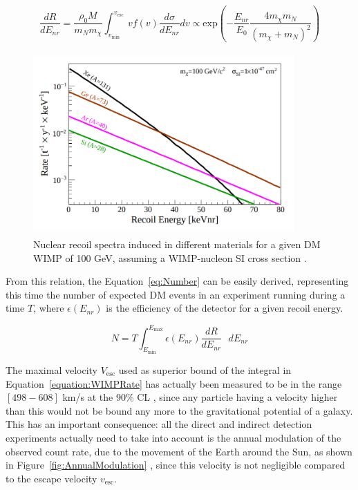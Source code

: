 \documentclass[a4paper, 10pt, openright]{report}
\begin{document}
\begin{equation}
\label{equation:WIMPRate}
\frac{dR}{dE_{nr}} = \frac{\rho_0 M}{m_N m_\chi} \int_{v_{\text{min}}}^{v_{\text{esc}}} v f(v) \frac{d \sigma}{dE_{nr}}dv \propto \text{exp} \left (- \frac{E_{nr}}{E_0} \frac{4 m_\chi m_N}{(m_\chi + m_N)^2} \right )
\end{equation}

\begin{figure}[htbp]
\begin{center}
\includegraphics[width=10cm, height=7cm]{figs/DirectFalling.png}
\caption{ Nuclear recoil spectra induced in different materials for a given \ac{DM} \ac{WIMP} of 100 GeV, assuming a WIMP-nucleon \ac{SI} cross section \cite{DirectSearches}.}
\label{fig:DirectFalling}
\end{center}
\end{figure}

From this relation, the Equation~\ref{eq:Number} can be easily derived, representing this time the number of expected \ac{DM} events in an experiment running during a time $T$, where $\epsilon(E_{nr})$ is the efficiency of the detector for a given recoil energy.

\begin{equation}
\label{eq:Number}
N = T \int_{E_{\text{min}}}^{E_{\text{max}}} \epsilon(E_{nr}) \frac{dR}{dE_{nr}} \text{ } dE_{nr}
\end{equation}

The maximal velocity $V_{\text{esc}}$ used as superior bound of the integral in Equation~\ref{equation:WIMPRate} has actually been measured to be in the range $[498-608]$ km/s at the 90\% \ac{CL} \cite{EscapeVelocity}, since any particle having a velocity higher than this would not be bound any more to the gravitational potential of a galaxy. This has an important consequence: all the direct and indirect detection experiments actually need to take into account is the annual modulation of the observed count rate, due to the movement of the Earth around the Sun, as shown in Figure~\ref{fig:AnnualModulation} \cite{AnnualModulation}, since this velocity is not negligible compared to the escape velocity $v_{\text{esc}}$. 
\end{document}
